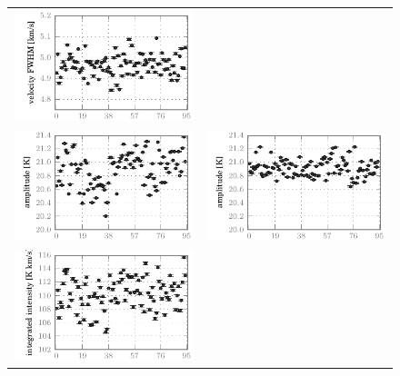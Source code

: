 \begin{figure}[p]
\begin{tabular}{@{}c@{}c@{}}
            \includegraphics{spread_87_core_vfwh_noisy}    \\
            \includegraphics{spread_87_core_ampl_corrected}&
            \includegraphics{spread_87_core_ampl_noisy}    \\
            \includegraphics{spread_87_core_iint_corrected}&

\end{tabular}
\end{figure}
